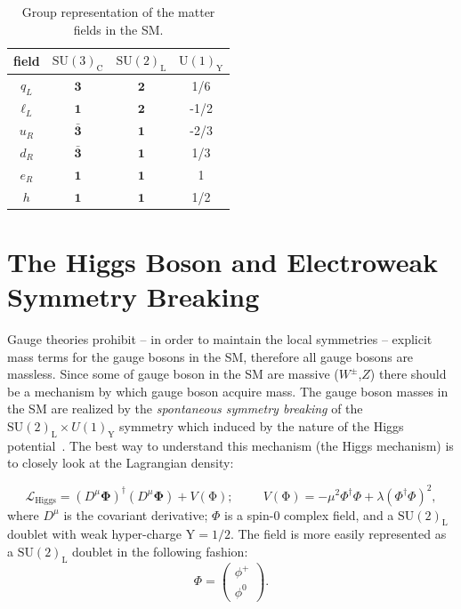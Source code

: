 \begin{table}[htb]
\centering
\large
\begin{tabular}{cccc}
  \hline
  \hline
  field &  $\mathrm{SU(3)_{C}}$ &  $\mathrm{SU(2)_{L}}$ & $\mathrm{U(1)_{Y}}$\\
  \hline                                                        
  $q_{L}$ & $\mathbf{3}$ &  $\mathbf{2}$ & 1/6\\
  $\ell_{L}$ & $\mathbf{1}$ &  $\mathbf{2}$ & -1/2\\
  $u_{R}$ & $\mathbf{\bar{3}}$ &  $\mathbf{1}$ &-2/3\\
  $d_{R}$ & $\mathbf{\bar{3}}$ &  $\mathbf{1}$ &1/3\\
  $e_{R}$ & $\mathbf{1}$ &  $\mathbf{1}$ & 1\\
  $h$ & $\mathbf{1}$ &  $\mathbf{1}$ & 1/2\\
  \hline
  \hline
\end{tabular}
  \caption{\label{tab:SMGroup} Group representation of the matter
    fields in the SM.}
\end{table}
\section{The Higgs Boson and Electroweak Symmetry
  Breaking}\label{higgs}
Gauge theories prohibit -- in order to maintain the local symmetries --  explicit mass terms for the gauge bosons in the SM,
therefore all gauge bosons are massless. Since some of gauge boson in
the SM are massive ($W^{\pm}$,$Z$) there should be a mechanism by
which gauge boson acquire mass. The gauge boson masses in the SM are
realized by the \textit{spontaneous symmetry breaking} of the
$\mathrm{SU(2)_{L}}\times U(1)_{\mathrm{Y}}$ symmetry which induced by the nature of
the Higgs potential~\cite{Englert,HIGGS1,HiGGS2,Guralnik,HIGGS3,Kibble}. The best way to understand this mechanism (the
Higgs mechanism) is to closely look at the Lagrangian density:

\begin{equation}
\label{eq:higgsPotential}
\mathcal{L}_{\mathrm{Higgs}} =
(D^{\mu}\mathbf{\Phi})^{\dagger}(D^{\mu}\mathbf{\Phi}) +
V(\mathrm{\Phi});\hspace{1cm} V(\mathrm{\Phi}) = -\mu^{2}\Phi^{\dagger}\Phi +\lambda(\Phi^{\dagger}\Phi)^{2},
\end{equation}
where $D^{\mu}$ is the covariant derivative; $\Phi$ is a spin-0
complex field, and a $\mathrm{SU(2)_{L}}$ doublet with weak
hyper-charge $\mathrm{Y} = 1/2$. The field is more easily represented
as a $\mathrm{SU(2)_{L}}$ doublet in the following fashion:
\begin{equation}
\label{eq:higgdoublet}
\Phi = \begin{pmatrix} \phi^{+}\\
  \phi^{0}\end{pmatrix}.
\end{equation}

